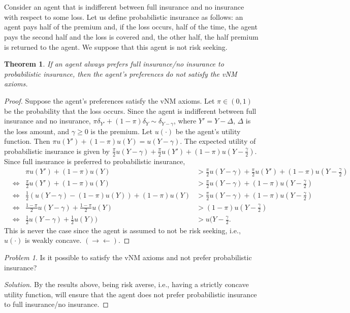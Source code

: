 \documentclass[12pt]{article}
\newtheorem{thm}{Theorem}[section]
\theoremstyle{definition}
\theoremstyle{remark}
\newtheorem{prob}{Problem}[section]
\def\contra{\rightarrow \leftarrow}
\begin{document}
\section{}
  Consider an agent that is indifferent between full insurance and no insurance with respect to some loss. Let us define probabilistic insurance as follows: an agent pays half of the premium and, if the loss occurs, half of the time, the agent pays the second half and the loss is covered and, the other half, the half premium is returned to the agent. We suppose that this agent is not risk seeking.
\begin{thm}
  If an agent always prefers full insurance/no insurance to probabilistic insurance, then the agent's preferences do not satisfy the vNM axioms.
\end{thm}
\begin{proof}
  Suppose the agent's preferences satisfy the vNM axioms. Let $\pi \in (0, 1)$ be the probability that the loss occurs. Since the agent is indifferent between full insurance and no insurance, $\pi \delta_{Y'} + (1 - \pi)\delta_Y \sim \delta_{Y-\gamma}$, where $Y' = Y - \Delta$, $\Delta$ is the loss amount, and $\gamma \geq 0$ is the premium. Let $u(\cdot)$ be the agent's utility function. Then $\pi u(Y') + (1 - \pi)u(Y) = u(Y - \gamma)$.
  The expected utility of probabilistic insurance is given by $\frac{\pi}{2}u(Y-\gamma) + \frac{\pi}{2}u(Y') + (1 - \pi)u(Y - \frac{\gamma}{2})$.
  Since full insurance is preferred to probabilistic insurance,
  \begin{align*}
    &      & \pi u(Y') + (1 - \pi)u(Y) &> \frac{\pi}{2}u(Y-\gamma) + \frac{\pi}{2}u(Y') + (1 - \pi)u(Y - \frac{\gamma}{2}) \\
    & \iff & \frac{\pi}{2} u(Y') + (1 - \pi)u(Y) &> \frac{\pi}{2}u(Y-\gamma) + (1 - \pi)u(Y - \frac{\gamma}{2}) \\
    & \iff & \frac{1}{2} (u(Y - \gamma) - (1 - \pi)u(Y)) + (1 - \pi)u(Y) &> \frac{\pi}{2}u(Y-\gamma) + (1 - \pi)u(Y - \frac{\gamma}{2}) \\
    & \iff & \frac{1 - \pi}{2} u(Y - \gamma) + \frac{1 - \pi}{2}u(Y) &> (1 - \pi)u(Y - \frac{\gamma}{2}) \\
    & \iff & \frac{1}{2} u(Y - \gamma) + \frac{1}{2}u(Y)) &> u(Y - \frac{\gamma}{2}.
  \end{align*}
  This is never the case since the agent is assumed to not be risk seeking, i.e., $u(\cdot)$ is weakly concave. $(\contra)$.
\end{proof}
\begin{prob}
  Is it possible to satisfy the vNM axioms and not prefer probabilistic insurance?
\end{prob}
\begin{proof}[Solution]
  By the results above, being risk averse, i.e., having a strictly concave utility function, will ensure that the agent does not prefer probabilistic insurance to full insurance/no insurance.
\end{proof}
%
%
\end{document}
